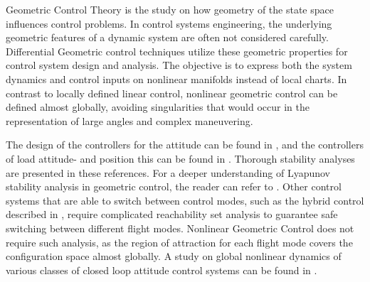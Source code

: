 Geometric Control Theory is the study on how geometry of the state space influences control problems. 
In control systems engineering, the underlying geometric features of a dynamic system are often not considered carefully. 
Differential Geometric control techniques utilize these geometric properties for control system design and analysis.
The objective is to express both the system dynamics and control inputs on nonlinear manifolds instead of local charts. 
In contrast to locally defined linear control, nonlinear geometric control can be defined almost globally, avoiding singularities that would occur in the representation of large angles and complex maneuvering.

The design of the controllers for the  attitude can be found in \cite{Lee2010}, and the controllers of load attitude- and position this can be found in \cite{Sreenath2013c}. Thorough stability analyses are presented in these references. For a deeper understanding of Lyapunov stability analysis in geometric control, the reader can refer to \cite{Bullo2005}.
Other control systems that are able to switch between control modes, such as the hybrid control described in \cite{Gillula2010}, require complicated reachability set analysis to guarantee safe switching between different flight modes.
Nonlinear Geometric Control does not require such analysis, as the region of attraction for each flight mode covers the configuration space almost globally. A study on global nonlinear dynamics of various classes of closed loop attitude control systems can be found in \cite{Chaturvedi2011a}. 

%
%
%
%
%
%
%


